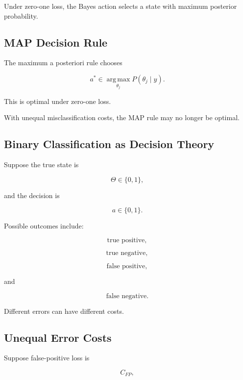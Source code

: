 Under zero-one loss, the Bayes action selects a state with maximum posterior
probability.

\subsection{MAP Decision Rule}
\label{subsec:map-decision-rule}

The maximum a posteriori rule chooses

\[
\boxed{
a^*
\in
\operatorname*{arg\,max}_{\theta_j}
P(\theta_j\mid y).
}
\]

This is optimal under zero-one loss.

With unequal misclassification costs, the MAP rule may no longer be
optimal.

\subsection{Binary Classification as Decision Theory}
\label{subsec:binary-classification-decision}

Suppose the true state is

\[
\Theta\in\{0,1\},
\]

and the decision is

\[
a\in\{0,1\}.
\]

Possible outcomes include:

\[
\boxed{
\text{true positive},
}
\]

\[
\boxed{
\text{true negative},
}
\]

\[
\boxed{
\text{false positive},
}
\]

and

\[
\boxed{
\text{false negative}.
}
\]

Different errors can have different costs.

\subsection{Unequal Error Costs}
\label{subsec:unequal-error-costs}

Suppose false-positive loss is

\[
C_{FP},
\]

